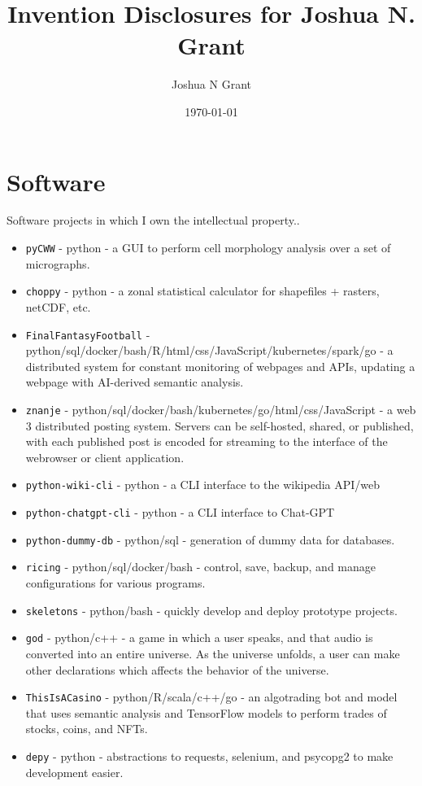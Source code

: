 \documentclass[10pt]{article}%
\author{Joshua N Grant}
\title{Invention Disclosures for Joshua N. Grant}
\date{\today{}}
\begin{document}
\maketitle
\section{Software}
 Software projects in which I own the intellectual property..
\begin{itemize}
  \item \texttt{pyCWW} - python - a GUI to perform cell morphology analysis over a set of micrographs.
  \item \texttt{choppy} - python - a zonal statistical calculator for shapefiles + rasters, netCDF, etc. 
  \item \texttt{FinalFantasyFootball} - python/sql/docker/bash/R/html/css/JavaScript/kubernetes/spark/go - a distributed system for constant monitoring of webpages and APIs, updating a webpage with AI-derived semantic analysis.
  \item \texttt{znanje} - python/sql/docker/bash/kubernetes/go/html/css/JavaScript - a web 3 distributed posting system. Servers can be self-hosted, shared, or published, with each published post is encoded for streaming to the interface of the webrowser or client application.
  \item \texttt{python-wiki-cli} - python - a CLI interface to the wikipedia API/web
  \item \texttt{python-chatgpt-cli} - python - a CLI interface to Chat-GPT
  \item \texttt{python-dummy-db} - python/sql - generation of dummy data for databases.
  \item \texttt{ricing} - python/sql/docker/bash - control, save, backup, and manage configurations for various programs.
  \item \texttt{skeletons} - python/bash - quickly develop and deploy prototype projects.
  \item \texttt{god} - python/c++ - a game in which a user speaks, and that audio is converted into an entire universe. As the universe unfolds, a user can make other declarations which affects the behavior of the universe.
  \item \texttt{ThisIsACasino} - python/R/scala/c++/go - an algotrading bot and model that uses semantic analysis and TensorFlow models to perform trades of stocks, coins, and NFTs.
  \item \texttt{depy} - python - abstractions to requests, selenium, and psycopg2 to make development easier.

\end{itemize}
\end{document}
